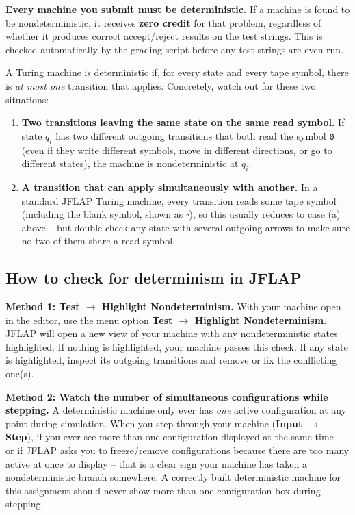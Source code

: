 \documentclass[11pt]{article}
\begin{document}
\textbf{Every machine you submit must be deterministic.} If a machine is
found to be nondeterministic, it receives \textbf{zero credit} for that
problem, regardless of whether it produces correct accept/reject results
on the test strings. This is checked automatically by the grading script
before any test strings are even run.

A Turing machine is deterministic if, for every state and every tape
symbol, there is \emph{at most one} transition that applies. Concretely,
watch out for these two situations:

\begin{enumerate}[label=(\alph*)]
  \item \textbf{Two transitions leaving the same state on the same read
        symbol.} If state $q_i$ has two different outgoing transitions
        that both read the symbol \texttt{0} (even if they write different
        symbols, move in different directions, or go to different states),
        the machine is nondeterministic at $q_i$.
  \item \textbf{A transition that can apply simultaneously with another.}
        In a standard JFLAP Turing machine, every transition reads some
        tape symbol (including the blank symbol, shown as \texttt{$\square$}), so
        this usually reduces to case (a) above -- but double check any
        state with several outgoing arrows to make sure no two of them
        share a read symbol.
\end{enumerate}

\subsection*{How to check for determinism in JFLAP}

\textbf{Method 1: Test $\to$ Highlight Nondeterminism.} With your machine
open in the editor, use the menu option \textbf{Test $\to$ Highlight
Nondeterminism}. JFLAP will open a new view of your machine with any
nondeterministic states highlighted. If nothing is highlighted, your
machine passes this check. If any state is highlighted, inspect its
outgoing transitions and remove or fix the conflicting one(s).

\textbf{Method 2: Watch the number of simultaneous configurations while
stepping.} A deterministic machine only ever has \emph{one} active
configuration at any point during simulation. When you step through your
machine (\textbf{Input $\to$ Step}), if you ever see more than one
configuration displayed at the same time -- or if JFLAP asks you to
freeze/remove configurations because there are too many active at once to
display -- that is a clear sign your machine has taken a nondeterministic
branch somewhere. A correctly built deterministic machine for this
assignment should never show more than one configuration box during
stepping.
\end{document}
